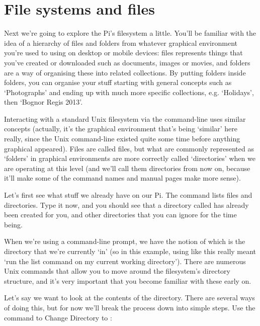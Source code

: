 \section{File systems and files}

Next we're going to explore the Pi's filesystem a little. You'll be familiar with the idea of a hierarchy of files and folders from whatever graphical environment you're used to using on desktop or mobile devices: files represents things that you've created or downloaded such as documents, images or movies, and folders are a way of organising these into related collections. By putting folders inside folders, you can organise your stuff starting with general concepts such as `Photographs' and ending up with much more specific collections, e.g. `Holidays', then `Bognor Regis 2013'.

Interacting with a standard Unix filesystem via the command-line uses similar concepts (actually, it's the graphical environment that's being `similar' here really, since the Unix command-line existed quite some time before anything graphical appeared). Files are called files, but what are commonly represented as `folders' in graphical environments are more correctly called `directories' when we are operating at this level (and we'll call them directories from now on, because it'll make some of the command names and manual pages make more sense).

Let's first see what stuff we already have on our Pi. The  command lists files and directories. Type it now, and you should see that a directory called  has already been created for you, and other directories that you can ignore for the time being.



When we're using a command-line prompt, we have the notion of  which is the directory that we're currently `in' (so in this example, using  like this really meant `run the list command on my current working directory'). There are numerous Unix commands that allow you to move around the filesystem's directory structure, and it's very important that you become familiar with these early on.

Let's say we want to look at the contents of the  directory. There are several ways of doing this, but for now we'll break the process down into simple steps. Use the  command to Change Directory to :

